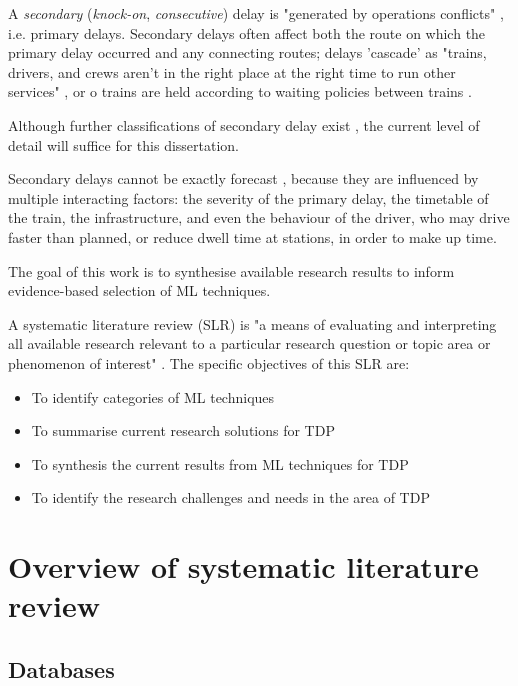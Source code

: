 \documentclass{article}
\begin{document}
A \textit{secondary} (\textit{knock-on}, \textit{consecutive}) delay is "generated by operations conflicts" \cite{cerreto_nielsen_harrod_nielsen_2016}, i.e. primary delays. Secondary delays often affect
both the route on which the primary delay occurred and any connecting routes; delays 'cascade' as "trains, drivers, and crews aren't in the right place at the right time to run other services" \cite{nr_knock_on_delays},
or o trains are held according to waiting policies between trains \cite{berger_et_al_2011}.

Although further classifications of secondary delay exist \cite{daamen_goverde_hansen_2008}, the current level of detail will suffice for this dissertation.

Secondary delays cannot be exactly forecast \cite{berger_et_al_2011}, \cite{milinkovic_markovic_veskovic_ivic_pavlovic_2013} because they are influenced by multiple interacting factors: the severity of the primary delay, the timetable of the train, the infrastructure, and even the behaviour of the driver, who may drive faster than planned, or reduce dwell time at stations, in order to make up time.

The goal of this work is to synthesise available research results to inform evidence-based selection of ML techniques.

A systematic literature review (SLR) is "a means of evaluating and interpreting all available research relevant to a particular research question or topic area or phenomenon of interest" \cite{williams_hollingsworth_2005}. The specific objectives of this SLR are:

\begin{itemize}
	\item To identify categories of ML techniques
	\item To summarise current research solutions for TDP
	\item To synthesis the current results from ML techniques for TDP
	\item To identify the research challenges and needs in the area of TDP
\end{itemize}

\section{Overview of systematic literature review}

\subsection{Databases}
\end{document}

